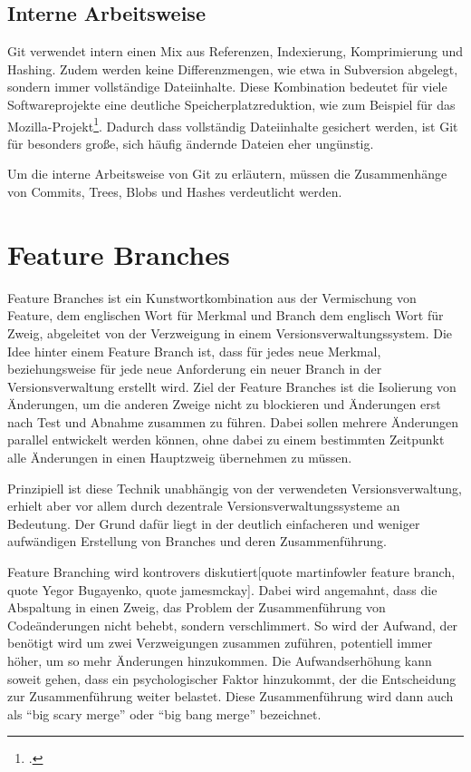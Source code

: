 \subsection{Interne Arbeitsweise}

Git verwendet intern einen Mix aus Referenzen, Indexierung, Komprimierung und Hashing. Zudem werden keine Differenzmengen, wie etwa in Subversion abgelegt, sondern immer vollständige Dateiinhalte. Diese Kombination bedeutet für viele Softwareprojekte eine deutliche Speicherplatzreduktion, wie zum Beispiel für das Mozilla-Projekt\footcite{kernel-git-svn}. Dadurch dass vollständig Dateiinhalte gesichert werden, ist Git für besonders große, sich häufig ändernde Dateien eher ungünstig.

Um die interne Arbeitsweise von Git zu erläutern, müssen die Zusammenhänge von Commits, Trees, Blobs und Hashes verdeutlicht werden.


\section{Feature Branches}

Feature Branches ist ein Kunstwortkombination aus der Vermischung von Feature, dem englischen Wort für Merkmal und Branch dem englisch Wort für Zweig, abgeleitet von der Verzweigung in einem Versionsverwaltungssystem. Die Idee hinter einem Feature Branch ist, dass für jedes neue Merkmal, beziehungsweise für jede neue Anforderung ein neuer Branch in der Versionsverwaltung erstellt wird. Ziel der Feature Branches ist die Isolierung von Änderungen, um die anderen Zweige nicht zu blockieren und Änderungen erst nach Test und Abnahme zusammen zu führen. Dabei sollen mehrere Änderungen parallel entwickelt werden können, ohne dabei zu einem bestimmten Zeitpunkt alle Änderungen in einen Hauptzweig übernehmen zu müssen.

Prinzipiell ist diese Technik unabhängig von der verwendeten Versionsverwaltung, erhielt aber vor allem durch dezentrale Versionsverwaltungssysteme an Bedeutung. Der Grund dafür liegt in der deutlich einfacheren und weniger aufwändigen Erstellung von Branches und deren Zusammenführung.

Feature Branching wird kontrovers diskutiert[quote martinfowler feature branch, quote Yegor Bugayenko, quote jamesmckay]. Dabei wird angemahnt, dass die Abspaltung in einen Zweig, das Problem der Zusammenführung von Codeänderungen nicht behebt, sondern verschlimmert. So wird der Aufwand, der benötigt wird um zwei Verzweigungen zusammen zuführen, potentiell immer höher, um so mehr Änderungen hinzukommen. Die Aufwandserhöhung kann soweit gehen, dass ein psychologischer Faktor hinzukommt, der die Entscheidung zur Zusammenführung weiter belastet. Diese Zusammenführung wird dann auch als ``big scary merge'' oder ``big bang merge'' bezeichnet.

